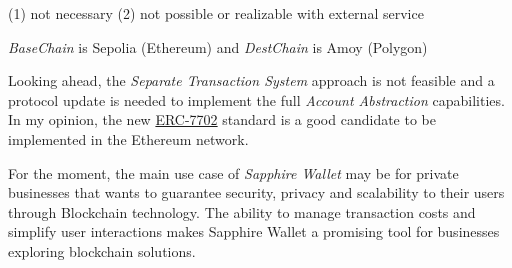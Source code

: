 \begin{table}[H]
    (1) not necessary
    (2) not possible or realizable with external service

    \textit{BaseChain} is Sepolia (Ethereum) and \textit{DestChain} is Amoy (Polygon)
\end{table}





Looking ahead, the \textit{Separate Transaction System} approach is not feasible and a protocol update is needed to implement the full \textit{Account Abstraction} capabilities. In my opinion, the new \hyperref[subsubsec:erc-7702]{ERC-7702} standard is a good candidate to be implemented in the Ethereum network.


For the moment, the main use case of \textit{Sapphire Wallet} may be for private businesses that wants to guarantee security, privacy and scalability to their users through Blockchain technology. The ability to manage transaction costs and simplify user interactions makes Sapphire Wallet a promising tool for businesses exploring blockchain solutions.
